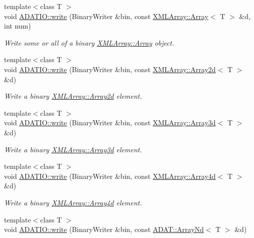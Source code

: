 \begin{DoxyCompactItemize}
{\footnotesize template$<$class T $>$ }\\void \mbox{\hyperlink{namespaceADATIO_a7a09030036bf1cc4704ecdcdf4cd6090}{A\+D\+A\+T\+I\+O\+::write}} (Binary\+Writer \&bin, const \mbox{\hyperlink{classXMLArray_1_1Array}{X\+M\+L\+Array\+::\+Array}}$<$ T $>$ \&d, int num)
\begin{DoxyCompactList}\small\item\em Write some or all of a binary \mbox{\hyperlink{classXMLArray_1_1Array}{X\+M\+L\+Array\+::\+Array}} object. \end{DoxyCompactList}\item 
{\footnotesize template$<$class T $>$ }\\void \mbox{\hyperlink{namespaceADATIO_a6e67aa5fde8e34135bde219592b6b55a}{A\+D\+A\+T\+I\+O\+::write}} (Binary\+Writer \&bin, const \mbox{\hyperlink{classXMLArray_1_1Array2d}{X\+M\+L\+Array\+::\+Array2d}}$<$ T $>$ \&d)
\begin{DoxyCompactList}\small\item\em Write a binary \mbox{\hyperlink{classXMLArray_1_1Array2d}{X\+M\+L\+Array\+::\+Array2d}} element. \end{DoxyCompactList}\item 
{\footnotesize template$<$class T $>$ }\\void \mbox{\hyperlink{namespaceADATIO_a7fbf1297a893fe12c3b03b9594408829}{A\+D\+A\+T\+I\+O\+::write}} (Binary\+Writer \&bin, const \mbox{\hyperlink{classXMLArray_1_1Array3d}{X\+M\+L\+Array\+::\+Array3d}}$<$ T $>$ \&d)
\begin{DoxyCompactList}\small\item\em Write a binary \mbox{\hyperlink{classXMLArray_1_1Array3d}{X\+M\+L\+Array\+::\+Array3d}} element. \end{DoxyCompactList}\item 
{\footnotesize template$<$class T $>$ }\\void \mbox{\hyperlink{namespaceADATIO_ad3c579901108d678f21ec1a97d0ab197}{A\+D\+A\+T\+I\+O\+::write}} (Binary\+Writer \&bin, const \mbox{\hyperlink{classXMLArray_1_1Array4d}{X\+M\+L\+Array\+::\+Array4d}}$<$ T $>$ \&d)
\begin{DoxyCompactList}\small\item\em Write a binary \mbox{\hyperlink{classXMLArray_1_1Array4d}{X\+M\+L\+Array\+::\+Array4d}} element. \end{DoxyCompactList}\item 
{\footnotesize template$<$class T $>$ }\\void \mbox{\hyperlink{namespaceADATIO_a0f804d3b56353fad83984a5668212660}{A\+D\+A\+T\+I\+O\+::write}} (Binary\+Writer \&bin, const \mbox{\hyperlink{classADAT_1_1ArrayNd}{A\+D\+A\+T\+::\+Array\+Nd}}$<$ T $>$ \&d)

\end{DoxyCompactItemize}
